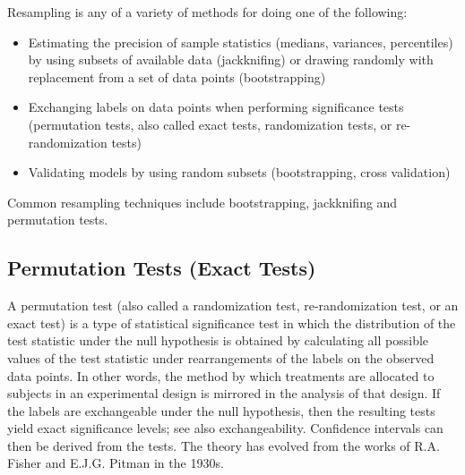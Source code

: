 Resampling is any of a variety of methods for doing one of the following:

\begin{itemize}
\item Estimating the precision of sample statistics (medians, variances, percentiles) by using subsets of available data (jackknifing) or drawing randomly with replacement from a set of data points (bootstrapping)
\item Exchanging labels on data points when performing significance tests (permutation tests, also called exact tests, randomization tests, or re-randomization tests)
\item Validating models by using random subsets (bootstrapping, cross validation)
\end{itemize}

Common resampling techniques include bootstrapping, jackknifing and permutation tests.


\subsection{Permutation Tests (Exact Tests)}
A permutation test (also called a randomization test, re-randomization test, or an exact test) is a type of statistical significance test in which the distribution of the test statistic under the null hypothesis is obtained by calculating all possible values of the test statistic under rearrangements of the labels on the observed data points. In other words, the method by which treatments are allocated to subjects in an experimental design is mirrored in the analysis of that design. If the labels are exchangeable under the null hypothesis, then the resulting tests yield exact significance levels; see also exchangeability. Confidence intervals can then be derived from the tests. The theory has evolved from the works of R.A. Fisher and E.J.G. Pitman in the 1930s.

